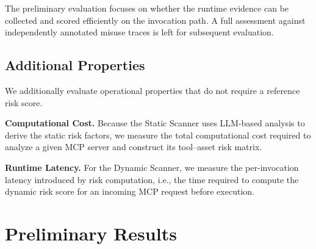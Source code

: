 \documentclass[sigconf]{acmart}
\begin{document}
The preliminary evaluation focuses on whether the runtime evidence can be
collected and scored efficiently on the invocation path. A full assessment
against independently annotated misuse traces is left for subsequent
evaluation.


\subsection{Additional Properties}
\label{sec:operational-eval}

We additionally evaluate operational properties that do not require a reference risk score.

\textbf{Computational Cost.}
Because the Static Scanner uses LLM-based analysis to derive the static risk factors, we measure the total computational cost required to analyze a given MCP server and construct its tool--asset risk matrix.

\textbf{Runtime Latency.}
For the Dynamic Scanner, we measure the per-invocation latency introduced by risk computation, i.e., the time required to compute the dynamic risk score for an incoming MCP request before execution.









\section{Preliminary Results}
\label{sec:results}
\end{document}
